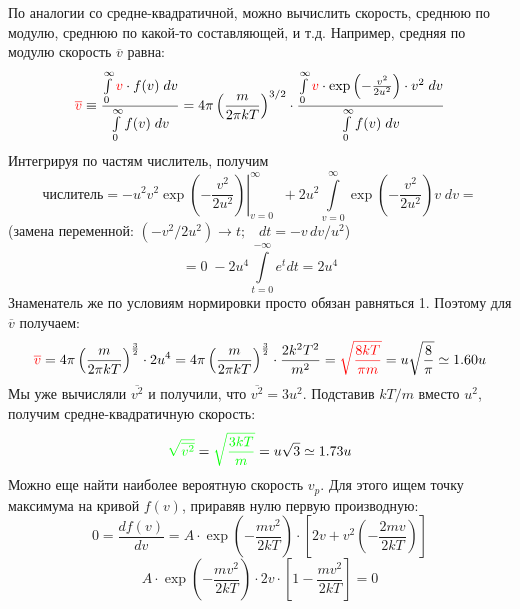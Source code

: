 \documentclass[12pt,epsfig,color,russian]{article}
\begin{document}
По аналогии со средне-квадратичной, можно вычислить скорость, сре\-д\-нюю по модулю, среднюю
по какой-то составляющей, и т.д. Например, средняя по модулю скорость {\color{red}$\overline{v}$} равна:
\begin{displaymath}
{\color{red}\overline{v}}\equiv\frac{\int\limits_0^\infty {\color{red}v}\cdot f(v)\;dv}
                         {\int\limits_0^\infty f(v)\;dv}=
4\pi\left(\frac{m}{2\pi kT}\right)^{3/2}\cdot
\frac{\int\limits_0^\infty {\color{red}v}\cdot\exp\left(-\frac{v^2}{2u^2}\right) \cdot v^2\;dv}
                         {\int\limits_0^\infty f(v)\;dv}
\end{displaymath}
Интегрируя по частям числитель, получим
\begin{displaymath}
 \texttt{числитель}=\left.-u^2v^2\exp\left(-\frac{v^2}{2u^2}\right)\right|_{v=0}^\infty\;\;
 +2u^2\int\limits_{v=0}^\infty\exp\left(-\frac{v^2}{2u^2}\right)v\;dv=
\end{displaymath}
(замена переменной: $(-v^2/2u^2)\rightarrow t; \;\;\; dt=-v\,dv/u^2$)
\begin{displaymath}
=0\;-2u^4\int\limits_{t=0}^{-\infty}e^tdt=2u^4
\end{displaymath}
Знаменатель же по условиям нормировки просто обязан равняться 1. Поэтому для  {\color{red}$\overline{v}$} получаем:
\begin{displaymath}
{\color{red}\overline{v}}=
4\pi\left(\frac{m}{2\pi kT}\right)^{\frac32}\cdot2u^4=4\pi\left(\frac{m}{2\pi kT}\right)^{\frac32}\cdot\frac{2k^2T^2}{m^2}={\color{red}\sqrt{\frac{8kT}{\pi m}}}
=u\sqrt{\frac{8}{\pi}}\simeq1.60u
\end{displaymath}
Мы уже вычисляли {\color{green}$\overline{v^2}$} и получили, что $\overline{v^2}=3u^2$. Подставив $kT/m$ вместо $u^2$, получим средне-квадратичную скорость:
\begin{displaymath}
{\color{green}\sqrt{\overline{v^2}}}={\color{green}\sqrt{\frac{3kT}{m}}}=u\sqrt{3}\simeq1.73u
\end{displaymath}
Можно еще найти наиболее вероятную скорость {\color{magenta}$v_p$}.  Для этого ищем точку максимума на кривой $f(v)$, приравяв нулю первую производную:
\begin{displaymath}
0=\frac{df(v)}{dv}=A\cdot\exp\left(-\frac{mv^2}{2kT}\right)\cdot
\left[2v+v^2\left(-\frac{2mv}{2kT}\right)\right]
\end{displaymath}
\begin{displaymath}
A\cdot\exp\left(-\frac{mv^2}{2kT}\right)\cdot2v\cdot
\left[1-\frac{mv^2}{2kT}\right]=0
\end{displaymath}
\end{document}
